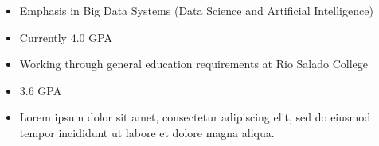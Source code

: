 \documentclass[10pt,a4paper,ragged2e,landscape]{altacv}
\begin{document}
\begin{itemize}
\item Emphasis in Big Data Systems (Data Science and Artificial Intelligence)
\item Currently 4.0 GPA  
\item Working through general education requirements at Rio Salado College
\end{itemize}
\divider

\begin{itemize}
\item  3.6 GPA
\item  Lorem ipsum dolor sit amet, consectetur adipiscing elit, sed do eiusmod tempor incididunt ut labore et dolore magna aliqua. 
\end{itemize}

\clearpage
\end{document}
